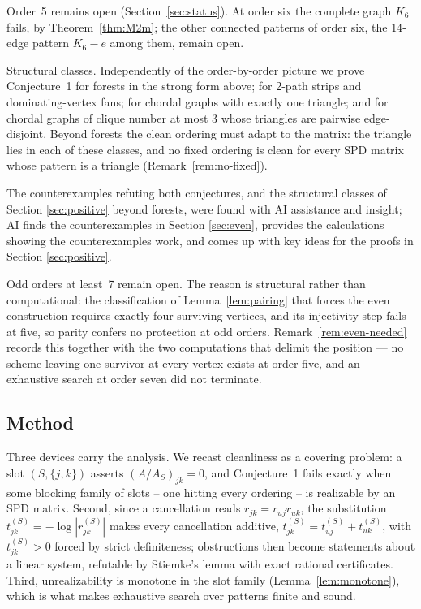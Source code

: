 \documentclass[11pt]{article}
\theoremstyle{plain}
\theoremstyle{definition}
\theoremstyle{remark}
\begin{document}
\begin{humanblock}
Order~5 remains open (Section~\ref{sec:status}). At order six the complete graph $K_6$ fails, by Theorem~\ref{thm:M2m}; the other connected patterns of order six, the $14$-edge pattern $K_6-e$ among them, remain open.

Structural classes. Independently of the order-by-order picture we prove Conjecture~1 for forests in the strong form above; for 2-path strips and dominating-vertex fans; for chordal graphs with exactly one triangle; and for chordal graphs of clique number at most $3$ whose triangles are pairwise edge-disjoint. Beyond forests the clean ordering must adapt to the matrix: the triangle lies in each of these classes, and no fixed ordering is clean for every SPD matrix whose pattern is a triangle (Remark~\ref{rem:no-fixed}).

  The counterexamples refuting both conjectures, and the structural classes of Section \ref{sec:positive} beyond forests, were found with AI assistance and insight; AI finds the counterexamples in Section \ref{sec:even}, provides the calculations showing the counterexamples work, and comes up with key ideas for the proofs in Section \ref{sec:positive}. 

Odd orders at least~7 remain open. The reason is structural rather than computational: the
classification of Lemma~\ref{lem:pairing} that forces the even construction requires exactly four
surviving vertices, and its injectivity step fails at five, so parity confers no protection at odd
orders. Remark~\ref{rem:even-needed} records this together with the two computations that delimit the
position --- no scheme leaving one survivor at every vertex exists at order five, and an exhaustive
search at order seven did not terminate.

\subsection{Method}

Three devices carry the analysis. We recast cleanliness as a covering problem: a slot $(S, \{j,k\})$ asserts $(A/A_S)_{jk} = 0$, and Conjecture~1 fails exactly when some blocking family of slots -- one hitting every ordering -- is realizable by an SPD matrix. Second, since a cancellation reads $r_{jk} = r_{uj}r_{uk}$, the substitution $t^{(S)}_{jk} = -\log|r^{(S)}_{jk}|$ makes every cancellation additive, $t^{(S)}_{jk} = t^{(S)}_{uj} + t^{(S)}_{uk}$, with $t^{(S)}_{jk}>0$ forced by strict definiteness; obstructions then become statements about a linear system, refutable by Stiemke's lemma \cite{Stiemke,Gordan} with exact rational certificates. Third, unrealizability is monotone in the slot family (Lemma~\ref{lem:monotone}), which is what makes exhaustive search over patterns finite and sound.


\end{humanblock}
\end{document}
